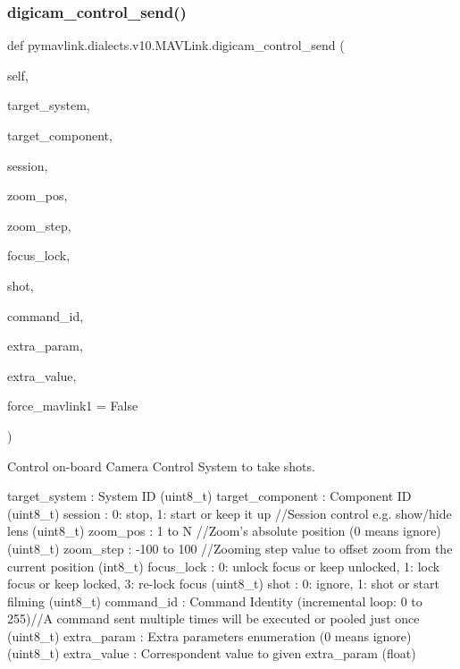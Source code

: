 \begin{DoxyVerb}
\begin{DoxyVerb}
\subsubsection{\texorpdfstring{digicam\+\_\+control\+\_\+send()}{digicam\_control\_send()}}
{\footnotesize\ttfamily def pymavlink.\+dialects.\+v10.\+M\+A\+V\+Link.\+digicam\+\_\+control\+\_\+send (\begin{DoxyParamCaption}\item[{}]{self,  }\item[{}]{target\+\_\+system,  }\item[{}]{target\+\_\+component,  }\item[{}]{session,  }\item[{}]{zoom\+\_\+pos,  }\item[{}]{zoom\+\_\+step,  }\item[{}]{focus\+\_\+lock,  }\item[{}]{shot,  }\item[{}]{command\+\_\+id,  }\item[{}]{extra\+\_\+param,  }\item[{}]{extra\+\_\+value,  }\item[{}]{force\+\_\+mavlink1 = {\ttfamily False} }\end{DoxyParamCaption})}

\begin{DoxyVerb}Control on-board Camera Control System to take shots.

target_system             : System ID (uint8_t)
target_component          : Component ID (uint8_t)
session                   : 0: stop, 1: start or keep it up //Session control e.g. show/hide lens (uint8_t)
zoom_pos                  : 1 to N //Zoom's absolute position (0 means ignore) (uint8_t)
zoom_step                 : -100 to 100 //Zooming step value to offset zoom from the current position (int8_t)
focus_lock                : 0: unlock focus or keep unlocked, 1: lock focus or keep locked, 3: re-lock focus (uint8_t)
shot                      : 0: ignore, 1: shot or start filming (uint8_t)
command_id                : Command Identity (incremental loop: 0 to 255)//A command sent multiple times will be executed or pooled just once (uint8_t)
extra_param               : Extra parameters enumeration (0 means ignore) (uint8_t)
extra_value               : Correspondent value to given extra_param (float)\end{DoxyVerb}
 \mbox{\label{classpymavlink_1_1dialects_1_1v10_1_1MAVLink_a2a2c3b17c85a3d0117698b342ae0598a}} 

\end{DoxyVerb}
\end{DoxyVerb}
